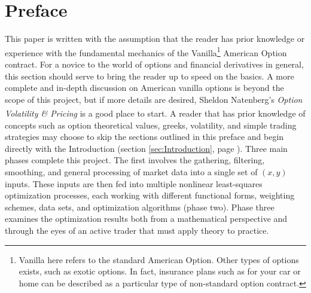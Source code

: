 \documentclass[12pt, a4paper, notitlepage]{article}
\numberwithin{equation}{subsection}
\numberwithin{figure}{subsection}
\numberwithin{table}{subsection}
\newcommand{\newpar}{\newline \newline}
\begin{document}
\begin{abstract}

\end{abstract}

\newpage
\tableofcontents

\newpage
\listoffigures

\newpage
\listoftables

\newpage
{}
\section{Preface} \label{sec:Preface}
This paper is written with the assumption that the reader has prior knowledge or experience with the fundamental mechanics of the Vanilla\footnote{Vanilla here refers to the standard American Option.  Other types of options exists, such as exotic options.  In fact, insurance plans such as for your car or home can be described as a particular type of non-standard option contract.} American Option contract.  For a novice to the world of options and financial derivatives in general, this section should serve to bring the reader up to speed on the basics.  A more complete and in-depth discussion on American vanilla options is beyond the scope of this project, but if more details are desired, Sheldon Natenberg's \textit{Option Volatility \& Pricing}\textsuperscript{\cite{Natenberg}} is a good place to start.  A reader that has prior knowledge of concepts such as option theoretical values, greeks, volatility, and simple trading strategies may choose to skip the sections outlined in this preface and begin directly with the Introduction (section \ref{sec:Introduction}, page \pageref{sec:Introduction}).
\newpar
Three main phases complete this project.  The first involves the gathering, filtering, smoothing, and general processing of market data into a single set of $(x,y)$ inputs.  These inputs are then fed into multiple nonlinear least-squares optimization processes, each working with different functional forms, weighting schemes, data sets, and optimization algorithms (phase two).  Phase three examines the optimization results both from a mathematical perspective and through the eyes of an active trader that must apply theory to practice.
\end{document}
